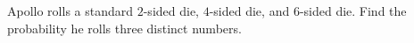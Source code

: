 Apollo rolls a standard $2$-sided die, $4$-sided die, and $6$-sided die. Find the probability he rolls three distinct numbers.
